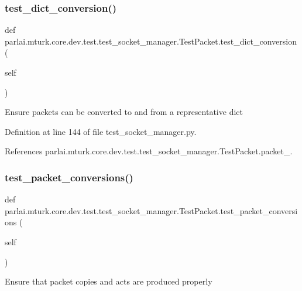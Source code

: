 \subsubsection{\texorpdfstring{test\+\_\+dict\+\_\+conversion()}{test\_dict\_conversion()}}
{\footnotesize\ttfamily def parlai.\+mturk.\+core.\+dev.\+test.\+test\+\_\+socket\+\_\+manager.\+Test\+Packet.\+test\+\_\+dict\+\_\+conversion (\begin{DoxyParamCaption}\item[{}]{self }\end{DoxyParamCaption})}

\begin{DoxyVerb}Ensure packets can be converted to and from a representative dict\end{DoxyVerb}
 

Definition at line 144 of file test\+\_\+socket\+\_\+manager.\+py.



References parlai.\+mturk.\+core.\+dev.\+test.\+test\+\_\+socket\+\_\+manager.\+Test\+Packet.\+packet\+\_.

\mbox{\label{classparlai_1_1mturk_1_1core_1_1dev_1_1test_1_1test__socket__manager_1_1TestPacket_a49f0b9a81a957f320143fec13a6455dc}} 
\subsubsection{\texorpdfstring{test\+\_\+packet\+\_\+conversions()}{test\_packet\_conversions()}}
{\footnotesize\ttfamily def parlai.\+mturk.\+core.\+dev.\+test.\+test\+\_\+socket\+\_\+manager.\+Test\+Packet.\+test\+\_\+packet\+\_\+conversions (\begin{DoxyParamCaption}\item[{}]{self }\end{DoxyParamCaption})}

\begin{DoxyVerb}Ensure that packet copies and acts are produced properly\end{DoxyVerb}
 

